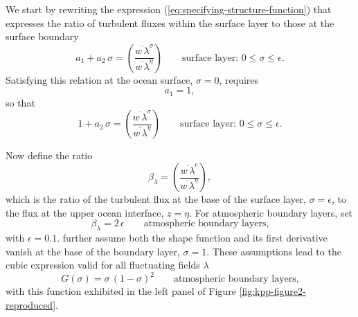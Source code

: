 We start by rewriting the expression
(\ref{eq:specifying-structure-function}) that expresses the ratio of
turbulent fluxes within the surface layer to those at the surface
boundary 
\begin{equation}
  a_{1} + a_{2} \, \sigma = \left( \frac{ \overline{w \, \lambda}^{\sigma}}{\overline{w \, \lambda}^{\eta}} \right)
 \qquad  \mbox{surface layer: $0 \le \sigma \le \epsilon$.}
\label{eq:specifying-structure-function-again}
\end{equation}
Satisfying this relation at the ocean surface, $\sigma=0$, requires
\begin{equation}
 a_{1} = 1, 
\end{equation}
 so that 
\begin{equation}
  1 + a_{2} \, \sigma = \left( \frac{ \overline{w \, \lambda}^{\sigma}}{\overline{w \, \lambda}^{\eta}} \right)
 \qquad  \mbox{surface layer: $0 \le \sigma \le \epsilon$.}
\label{eq:specifying-structure-function-againB}
\end{equation}

Now define the ratio
\begin{equation}
  \beta_{\lambda} = \left( \frac{ \overline{w \, \lambda}^{\epsilon}}{\overline{w \, \lambda}^{\eta}} \right),
\label{eq:beta-lambda-defined}
\end{equation}
which is the ratio of the turbulent flux at the base of the surface
layer, $\sigma = \epsilon$, to the flux at the upper ocean interface,
$z=\eta$.  For atmospheric boundary layers, \cite{Troen_Mahrt1986} set
\begin{equation}
 \beta_{\lambda}  = 2 \, \epsilon \qquad \mbox{atmospheric boundary layers,} 
\end{equation}
with $\epsilon=0.1$.  \cite{Troen_Mahrt1986} further assume both the
shape function and its first derivative vanish at the base of the
boundary layer, $\sigma=1$.  These assumptions lead to the cubic
expression valid for all fluctuating fields $\lambda$
\begin{equation}
 G(\sigma) = \sigma \, (1-\sigma)^{2}   \qquad \mbox{atmospheric boundary layers,}
\end{equation}
with this function exhibited in the left panel of Figure
\ref{fig:kpp-figure2-reproduced}.  

